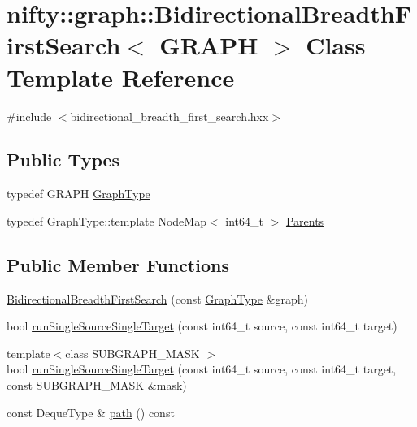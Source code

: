 \hypertarget{classnifty_1_1graph_1_1BidirectionalBreadthFirstSearch}{}\section{nifty\+:\+:graph\+:\+:Bidirectional\+Breadth\+First\+Search$<$ G\+R\+A\+PH $>$ Class Template Reference}
\label{classnifty_1_1graph_1_1BidirectionalBreadthFirstSearch}


{\ttfamily \#include $<$bidirectional\+\_\+breadth\+\_\+first\+\_\+search.\+hxx$>$}

\subsection*{Public Types}
\begin{DoxyCompactItemize}
\item 
typedef G\+R\+A\+PH \hyperlink{classnifty_1_1graph_1_1BidirectionalBreadthFirstSearch_a2a6e6ffd9c93b416a8bc1ad26dff97ac}{Graph\+Type}
\item 
typedef Graph\+Type\+::template Node\+Map$<$ int64\+\_\+t $>$ \hyperlink{classnifty_1_1graph_1_1BidirectionalBreadthFirstSearch_ac0997b426ed5c99713a89f355bbb2950}{Parents}
\end{DoxyCompactItemize}
\subsection*{Public Member Functions}
\begin{DoxyCompactItemize}
\item 
\hyperlink{classnifty_1_1graph_1_1BidirectionalBreadthFirstSearch_abff43678fb2a1c133941ee8f65101f91}{Bidirectional\+Breadth\+First\+Search} (const \hyperlink{classnifty_1_1graph_1_1BidirectionalBreadthFirstSearch_a2a6e6ffd9c93b416a8bc1ad26dff97ac}{Graph\+Type} \&graph)
\item 
bool \hyperlink{classnifty_1_1graph_1_1BidirectionalBreadthFirstSearch_af6ae063fd07eb6635ebc070dac6d2730}{run\+Single\+Source\+Single\+Target} (const int64\+\_\+t source, const int64\+\_\+t target)
\item 
{\footnotesize template$<$class S\+U\+B\+G\+R\+A\+P\+H\+\_\+\+M\+A\+SK $>$ }\\bool \hyperlink{classnifty_1_1graph_1_1BidirectionalBreadthFirstSearch_a4ddc85ac7f5b28bec9f729d0120b4692}{run\+Single\+Source\+Single\+Target} (const int64\+\_\+t source, const int64\+\_\+t target, const S\+U\+B\+G\+R\+A\+P\+H\+\_\+\+M\+A\+SK \&mask)
\item 
const Deque\+Type \& \hyperlink{classnifty_1_1graph_1_1BidirectionalBreadthFirstSearch_a8cb65a4e1ba03070fa77b4e8e8354332}{path} () const
\end{DoxyCompactItemize}


